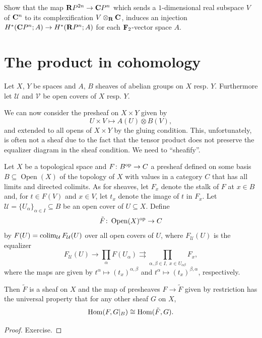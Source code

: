 \documentclass[a4paper,openany]{scrbook}
\DeclareMathOperator{\Open}{Open}
\begin{document}
\begin{exer}\label{exer:complexificationincohomology}
Show that the map $\mathbf R P^{2n} \to \mathbf C P^n$ which sends a $1$-dimensional real subspace $V$ of $\mathbf C^n$ to its complexification $V \otimes_\mathbf R \mathbf C$, induces an injection $H^*(\mathbf C P^n;A) \to H^*(\mathbf R P^n;A)$ for each $\mathbf F_2$-vector space $A$.
\end{exer}

\section{The product in cohomology}

Let $X$, $Y$ be spaces and $A$, $B$ sheaves of abelian groups on $X$ resp. $Y$. Furthermore let $\mathcal U$ and $\mathcal V$ be open covers of $X$ resp. $Y$. 

We can now consider the presheaf on $X \times Y$ given by
\[
U \times V \mapsto A(U) \otimes B(V),
\]
and extended to all opens of $X \times Y$ by the gluing condition. This, unfortunately, is often not a sheaf due to the fact that the tensor product does not preserve the equalizer diagram in the sheaf condition. We need to “sheafify”.

\begin{prop}
Let $X$ be a topological space and $F\colon B^{\operatorname{op}} \to C$ a presheaf defined on some basis $B \subseteq \Open(X)$ of the topology of $X$ with values in a category $C$ that has all limits and directed colimits. As for sheaves, let $F_x$ denote the stalk of $F$ at $x \in B$ and, for $t \in F(V)$ and $x \in V$, let $t_x$ denote the image of $t$ in $F_x$. Let $\mathcal U = \{U_\alpha\}_{\alpha \in I} \subseteq B$ be an open cover of $U \subseteq X$. Define
\[
\tilde F\colon \Open(X)^\op \to C
\]
by $F(U) = \colim_{\mathcal U} F_{\mathcal U}(U)$ over all open covers of $U$, where $F_{\mathcal U}(U)$ is the equalizer
\[
F_{\mathcal U}(U) \to \prod_{\alpha} F(U_\alpha) \rightrightarrows \prod_{\alpha,\beta \in I,\; x \in U_{\alpha\beta}} F_x,
\]
where the maps are given by $t^\alpha \mapsto (t_x)^{\alpha,\beta}$ and $t^\alpha \mapsto (t_x)^{\beta,\alpha}$, respectively.

Then $\tilde F$ is a sheaf on $X$ and the map of presheaves $F \to \tilde F$ given by restriction has the universal property that for any other sheaf $G$ on $X$,
\[
\operatorname{Hom}(F,G|_B) \cong \operatorname{Hom}(\tilde F,G).
\]
\end{prop}
\begin{proof}
Exercise.
\end{proof}
\end{document}
